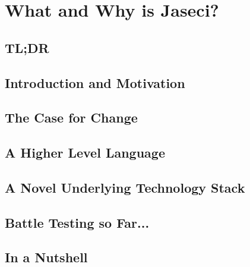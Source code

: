 \chapter{What and Why is Jaseci?}
\minitoc
\section{TL;DR}

\section{Introduction and Motivation}

\section{The Case for Change}

\section{A Higher Level Language}

\section{A Novel Underlying Technology Stack}

\section{Battle Testing so Far...}

\section{In a Nutshell}

